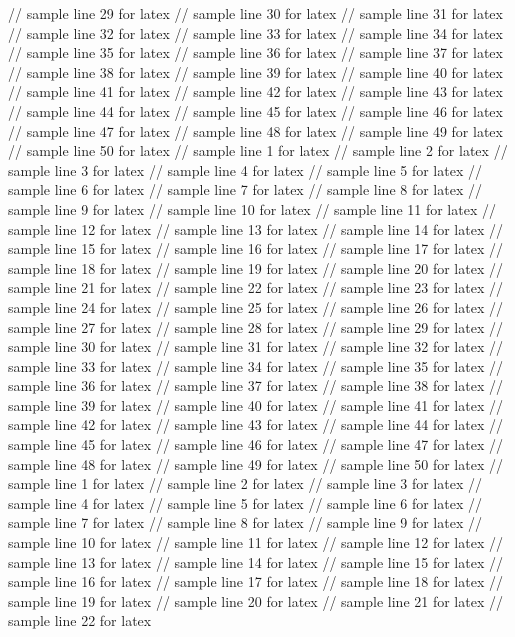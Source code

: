 // sample line 29 for latex
// sample line 30 for latex
// sample line 31 for latex
// sample line 32 for latex
// sample line 33 for latex
// sample line 34 for latex
// sample line 35 for latex
// sample line 36 for latex
// sample line 37 for latex
// sample line 38 for latex
// sample line 39 for latex
// sample line 40 for latex
// sample line 41 for latex
// sample line 42 for latex
// sample line 43 for latex
// sample line 44 for latex
// sample line 45 for latex
// sample line 46 for latex
// sample line 47 for latex
// sample line 48 for latex
// sample line 49 for latex
// sample line 50 for latex
// sample line 1 for latex
// sample line 2 for latex
// sample line 3 for latex
// sample line 4 for latex
// sample line 5 for latex
// sample line 6 for latex
// sample line 7 for latex
// sample line 8 for latex
// sample line 9 for latex
// sample line 10 for latex
// sample line 11 for latex
// sample line 12 for latex
// sample line 13 for latex
// sample line 14 for latex
// sample line 15 for latex
// sample line 16 for latex
// sample line 17 for latex
// sample line 18 for latex
// sample line 19 for latex
// sample line 20 for latex
// sample line 21 for latex
// sample line 22 for latex
// sample line 23 for latex
// sample line 24 for latex
// sample line 25 for latex
// sample line 26 for latex
// sample line 27 for latex
// sample line 28 for latex
// sample line 29 for latex
// sample line 30 for latex
// sample line 31 for latex
// sample line 32 for latex
// sample line 33 for latex
// sample line 34 for latex
// sample line 35 for latex
// sample line 36 for latex
// sample line 37 for latex
// sample line 38 for latex
// sample line 39 for latex
// sample line 40 for latex
// sample line 41 for latex
// sample line 42 for latex
// sample line 43 for latex
// sample line 44 for latex
// sample line 45 for latex
// sample line 46 for latex
// sample line 47 for latex
// sample line 48 for latex
// sample line 49 for latex
// sample line 50 for latex
// sample line 1 for latex
// sample line 2 for latex
// sample line 3 for latex
// sample line 4 for latex
// sample line 5 for latex
// sample line 6 for latex
// sample line 7 for latex
// sample line 8 for latex
// sample line 9 for latex
// sample line 10 for latex
// sample line 11 for latex
// sample line 12 for latex
// sample line 13 for latex
// sample line 14 for latex
// sample line 15 for latex
// sample line 16 for latex
// sample line 17 for latex
// sample line 18 for latex
// sample line 19 for latex
// sample line 20 for latex
// sample line 21 for latex
// sample line 22 for latex
